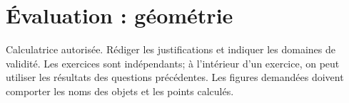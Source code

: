 \begingroup
\chapter*{Évaluation : géométrie}
\renewcommand{\thebmtexo}{DS3.\arabic{bmtexo}}
\renewcommand{\theHbmtexo}{DS3.\arabic{bmtexo}}
\setcounter{bmtexo}{0}
\begin{devoir}
Calculatrice autorisée. Rédiger les justifications et indiquer les domaines de validité. Les exercices sont indépendants; à l’intérieur d’un exercice, on peut utiliser les résultats des questions précédentes. Les figures demandées doivent comporter les noms des objets et les points calculés.
\end{devoir}

